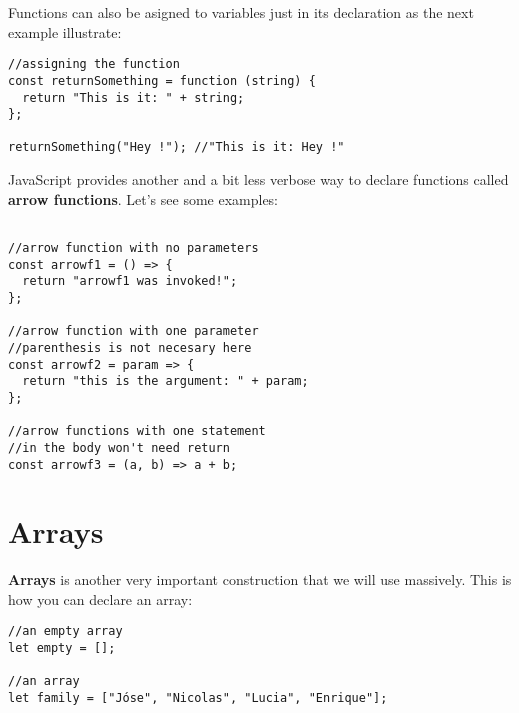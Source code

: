 \documentclass[a4paper, oneside, titlepage, 12pt]{book}
\begin{document}
Functions can also be asigned to variables just in its declaration as the next example illustrate:

\begin{verbatim}
//assigning the function
const returnSomething = function (string) {
  return "This is it: " + string;
};

returnSomething("Hey !"); //"This is it: Hey !"
\end{verbatim}



JavaScript provides another and a bit less verbose way to declare functions called \textbf{arrow functions}. Let's see some examples:

\begin{verbatim}
               
//arrow function with no parameters
const arrowf1 = () => {
  return "arrowf1 was invoked!";
};

//arrow function with one parameter
//parenthesis is not necesary here
const arrowf2 = param => {
  return "this is the argument: " + param;
};

//arrow functions with one statement 
//in the body won't need return 
const arrowf3 = (a, b) => a + b;
\end{verbatim}

\section{Arrays} \label{arrays}

\textbf{Arrays} is another very important construction that we will use massively. This is how you can declare an array:

\begin{verbatim}
//an empty array
let empty = [];

//an array
let family = ["Jóse", "Nicolas", "Lucia", "Enrique"];
\end{verbatim}
\end{document}
